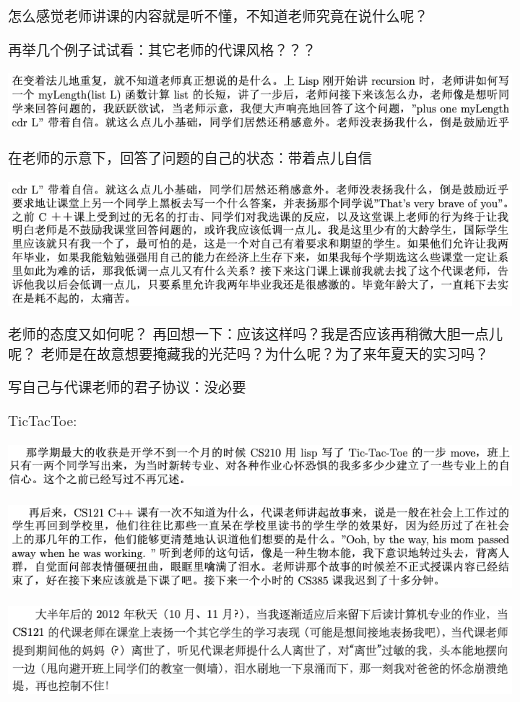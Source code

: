 \documentclass[9pt, b5paper]{article}
\begin{document}
怎么感觉老师讲课的内容就是听不懂，不知道老师究竟在说什么呢？

再举几个例子试试看：其它老师的代课风格？？？

\begin{center}
\includegraphics[width=.9\linewidth]{./pic/backups_plans_20210424_204032.png}
\end{center}

在老师的示意下，回答了问题的自己的状态：带着点儿自信

\begin{center}
\includegraphics[width=.9\linewidth]{./pic/backups_plans_20210424_204405.png}
\end{center}

老师的态度又如何呢？
再回想一下：应该这样吗？我是否应该再稍微大胆一点儿呢？
老师是在故意想要掩藏我的光茫吗？为什么呢？为了来年夏天的实习吗？

写自己与代课老师的君子协议：没必要

TicTacToe:

\begin{center}
\includegraphics[width=.9\linewidth]{./pic/backups_plans_20210424_205732.png}
\end{center}

\begin{center}
\includegraphics[width=.9\linewidth]{./pic/backups_plans_20210424_205104.png}
\end{center}

\begin{center}
\includegraphics[width=.9\linewidth]{./pic/backups_plans_20210424_205605.png}
\end{center}
\end{document}
